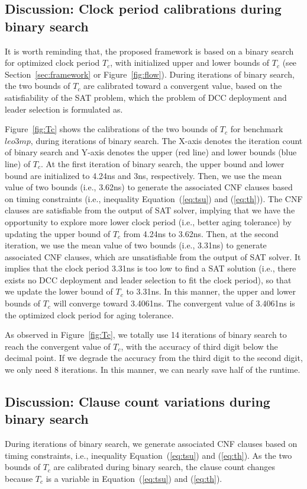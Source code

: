\subsection{Discussion: Clock period calibrations during binary search}

It is worth reminding that, the proposed framework is based on a binary search for optimized clock period $T_{c}$, with initialized upper and lower bounds of $T_{c}$ (see Section~\ref{sec:framework} or Figure~\ref{fig:flow}). During iterations of binary search, the two bounds of $T_{c}$ are calibrated toward a convergent value, based on the satisfiability of the SAT problem, which the problem of DCC deployment and leader selection is formulated as.

Figure~\ref{fig:Tc} shows the calibrations of the two bounds of $T_{c}$ for benchmark $leo3mp$, during iterations of binary search. The X-axis denotes the iteration count of binary search and Y-axis denotes the upper (red line) and lower bounds (blue line) of $T_{c}$. At the first iteration of binary search, the upper bound and lower bound are initialized to 4.24ns and 3ns, respectively. Then, we use the mean value of two bounds (i.e., 3.62ns) to generate the associated CNF clauses based on timing constraints (i.e., inequality Equation~(\ref{eq:tsu}) and (\ref{eq:th})). The CNF clauses are satisfiable from the output of SAT solver, implying that we have the opportunity to explore more lower clock period (i.e., better aging tolerance) by updating the upper bound of $T_{c}$ from 4.24ns to 3.62ns. Then, at the second iteration, we use the mean value of two bounds (i.e., 3.31ns) to generate associated CNF clauses, which are unsatisfiable from the output of SAT solver. It implies that the clock period 3.31ns is too low to find a SAT solution (i.e., there exists no DCC deployment and leader selection to fit the clock period), so that we update the lower bound of $T_{c}$ to 3.31ns. In this manner, the upper and lower bounds of $T_{c}$ will converge toward 3.4061ns. The convergent value of 3.4061ns is the optimized clock period for aging tolerance.

As observed in Figure~\ref{fig:Tc}, we totally use 14 iterations of binary search to reach the convergent value of $T_{c}$, with the accuracy of third digit below the decimal point. If we degrade the accuracy from the third digit to the second digit, we only need 8 iterations. In this manner, we can nearly save half of the runtime. 
\subsection{Discussion: Clause count variations during binary search}

During iterations of binary search, we generate associated CNF clauses based on timing constraints, i.e., inequality Equation~(\ref{eq:tsu}) and (\ref{eq:th}). 
As the two bounds of $T_{c}$ are calibrated during binary search, the clause count changes because $T_{c}$ is a variable in Equation~(\ref{eq:tsu}) and (\ref{eq:th}). 

